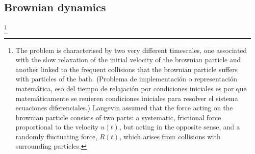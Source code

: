 \documentclass[../../main-notes.tex]{subfiles}
\begin{document}
\subsection{Brownian dynamics}\footnote{ 
The problem is characterised by two very different timescales, one associated with the slow relaxation of the initial velocity of the brownian particle and another linked to the frequent collisions that the brownian particle suffers with particles of the bath. (Problema de implementación o representación matemática, eso del tiempo de relajación por condiciones iniciales es por que matemáticamente se reuieren condiciones iniciales para resolver el sistema ecuaciones diferenciales.) 
Langevin assumed that the force acting on the brownian particle consists of two parts: a systematic, frictional force proportional to the velocity $u(t)$, but acting in the opposite sense, and a randomly fluctuating force, $R(t)$, which arises from collisions with surrounding particles\citep{tsl2006}.
}
\end{document}
